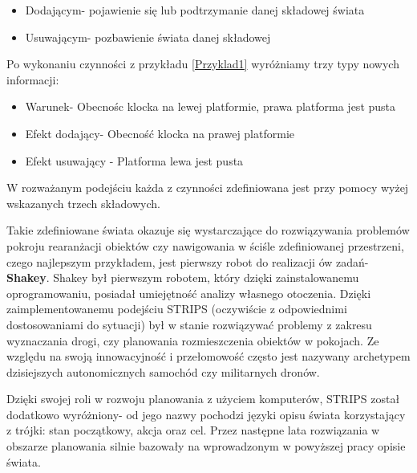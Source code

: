     \begin{itemize}
        \item Dodającym- pojawienie się lub podtrzymanie danej składowej świata
        \item Usuwającym- pozbawienie świata danej składowej
    \end{itemize}
    Po wykonaniu czynności z przykładu \ref{Przyklad1} wyróżniamy trzy typy nowych informacji:
    \begin{itemize}
        \item Warunek- Obecnośc klocka na lewej platformie, prawa platforma jest pusta
        \item Efekt dodający- Obecność klocka na prawej platformie
        \item Efekt usuwający - Platforma lewa jest pusta
    \end{itemize}
    W rozważanym podejściu każda z czynności zdefiniowana jest przy pomocy wyżej wskazanych trzech składowych.

        Takie zdefiniowane świata okazuje się wystarczające do rozwiązywania problemów pokroju rearanżacji obiektów czy 
    nawigowania w ściśle zdefiniowanej przestrzeni, czego najlepszym przykładem, jest pierwszy robot do realizacji ów zadań- \textbf{Shakey}.
    Shakey był pierwszym robotem, który dzięki zainstalowanemu oprogramowaniu,
    posiadał umiejętność analizy własnego otoczenia. Dzięki zaimplementowanemu podejściu 
    STRIPS (oczywiście z odpowiednimi dostosowaniami do sytuacji) był w stanie rozwiązywać problemy z zakresu wyznaczania drogi,
    czy planowania rozmieszczenia obiektów w pokojach.
    Ze względu na swoją innowacyjność i przełomowość często jest nazywany archetypem
    dzisiejszych autonomicznych samochód czy militarnych dronów.

    Dzięki swojej roli w rozwoju planowania z użyciem komputerów, STRIPS został dodatkowo wyróżniony- od jego nazwy pochodzi języki opisu świata korzystający
    z trójki: stan początkowy, akcja oraz cel. Przez następne lata rozwiązania w obszarze planowania silnie bazowały na wprowadzonym w powyższej pracy opisie świata.

